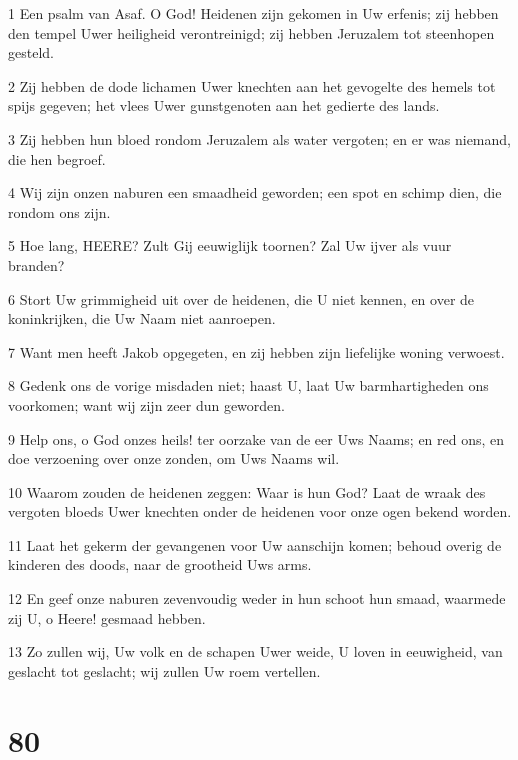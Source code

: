\par 1 Een psalm van Asaf. O God! Heidenen zijn gekomen in Uw erfenis; zij hebben den tempel Uwer heiligheid verontreinigd; zij hebben Jeruzalem tot steenhopen gesteld.
\par 2 Zij hebben de dode lichamen Uwer knechten aan het gevogelte des hemels tot spijs gegeven; het vlees Uwer gunstgenoten aan het gedierte des lands.
\par 3 Zij hebben hun bloed rondom Jeruzalem als water vergoten; en er was niemand, die hen begroef.
\par 4 Wij zijn onzen naburen een smaadheid geworden; een spot en schimp dien, die rondom ons zijn.
\par 5 Hoe lang, HEERE? Zult Gij eeuwiglijk toornen? Zal Uw ijver als vuur branden?
\par 6 Stort Uw grimmigheid uit over de heidenen, die U niet kennen, en over de koninkrijken, die Uw Naam niet aanroepen.
\par 7 Want men heeft Jakob opgegeten, en zij hebben zijn liefelijke woning verwoest.
\par 8 Gedenk ons de vorige misdaden niet; haast U, laat Uw barmhartigheden ons voorkomen; want wij zijn zeer dun geworden.
\par 9 Help ons, o God onzes heils! ter oorzake van de eer Uws Naams; en red ons, en doe verzoening over onze zonden, om Uws Naams wil.
\par 10 Waarom zouden de heidenen zeggen: Waar is hun God? Laat de wraak des vergoten bloeds Uwer knechten onder de heidenen voor onze ogen bekend worden.
\par 11 Laat het gekerm der gevangenen voor Uw aanschijn komen; behoud overig de kinderen des doods, naar de grootheid Uws arms.
\par 12 En geef onze naburen zevenvoudig weder in hun schoot hun smaad, waarmede zij U, o Heere! gesmaad hebben.
\par 13 Zo zullen wij, Uw volk en de schapen Uwer weide, U loven in eeuwigheid, van geslacht tot geslacht; wij zullen Uw roem vertellen.

\chapter{80}

